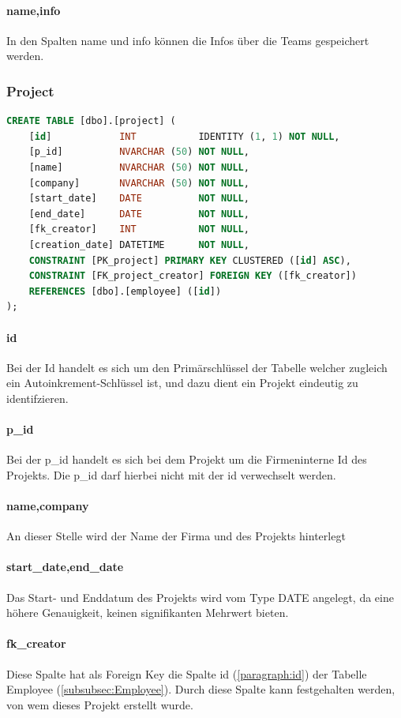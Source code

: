 \documentclass{article}
\begin{document}
\paragraph{name,info} In den Spalten name und info können die Infos über die Teams gespeichert
werden.

\subsubsection{Project}
\label{subsubsection:project}
\begin{lstlisting}[language=Sql, caption= Create Table Statement für Project Table]
    CREATE TABLE [dbo].[project] (
    [id]            INT           IDENTITY (1, 1) NOT NULL,
    [p_id]          NVARCHAR (50) NOT NULL,
    [name]          NVARCHAR (50) NOT NULL,
    [company]       NVARCHAR (50) NOT NULL,
    [start_date]    DATE          NOT NULL,
    [end_date]      DATE          NOT NULL,
    [fk_creator]    INT           NOT NULL,
    [creation_date] DATETIME      NOT NULL,
    CONSTRAINT [PK_project] PRIMARY KEY CLUSTERED ([id] ASC),
    CONSTRAINT [FK_project_creator] FOREIGN KEY ([fk_creator]) 
    REFERENCES [dbo].[employee] ([id])
);
         \end{lstlisting}
\paragraph{id}
\label{paragraph:projectId}  Bei der Id handelt es sich um den Primärschlüssel der Tabelle welcher zugleich
ein Autoinkrement-Schlüssel ist, und dazu dient ein Projekt eindeutig zu
identifzieren.

\paragraph{p\_id} Bei der p\_id handelt es sich bei dem Projekt um die Firmeninterne Id des
Projekts. Die p\_id darf hierbei nicht mit der id verwechselt werden.
\paragraph{name,company} An dieser Stelle wird der Name der Firma und des Projekts hinterlegt
\paragraph{start\_date,end\_date} Das Start- und Enddatum des Projekts wird vom Type DATE angelegt, da eine
höhere Genauigkeit, keinen signifikanten Mehrwert bieten.
\paragraph{fk\_creator}  Diese Spalte hat als Foreign Key die Spalte id (\ref{paragraph:id}) der Tabelle
Employee (\ref{subsubsec:Employee}). Durch diese Spalte kann festgehalten
werden, von wem dieses Projekt erstellt wurde.
\end{document}
